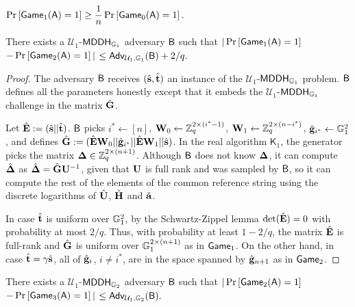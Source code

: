 \begin{lemma} $\Pr\left[ \mathsf{Game}_1(\mathsf{A})=1\right]\geq\dfrac{1}{n}\Pr\left[\mathsf{Game}_0(\mathsf{A})=1\right].$
\label{lemma:bits1}
\end{lemma}

\begin{lemma} There exists a $\mathcal{U}_1$-$\mathsf{MDDH}_{\mathbb{G}_1}$ adversary $\mathsf{B}$ such that
$|\Pr\left[\mathsf{Game}_{1}(\mathsf{A})=1\right]$ $-\Pr\left[\mathsf{Game}_{2}(\mathsf{A})=1\right]|$ $\leq
    \mathsf{Adv}_{\mathcal{U}_1,\mathbb{G}_1}(\mathsf{B}) + 2/q.$
\label{lemma:bits2}
\end{lemma}
\begin{proof}
The adversary $\mathsf{B}$ receives $({\hat{\mathbf{s}}}, {\hat{\mathbf{t}}})$ an instance of the $\mathcal{U}_1$-$\mathsf{MDDH}_{\mathbb{G}_1}$ problem.
$\mathsf{B}$ defines all the parameters honestly except that
it embeds the $\mathcal{U}_1$-$\mathsf{MDDH}_{\mathbb{G}_1}$ challenge in the matrix 
$\hat{\mathbf{{G}}}$.

Let ${\hat{\mathbf{{E}}}}:=({\hat{\mathbf{s}}}||{\hat{\mathbf{t}}})$. $\mathsf{B}$ picks $i^*\gets[n]$, $\mathbf{{W}}_0\gets\mathbb{Z}_q^{2\times(i^*-1)}$,
$\mathbf{{W}}_1\gets\mathbb{Z}_q^{2\times(n-i^*)}$,
$\hat{\mathbf{g}}_{i^*}\gets\mathbb{G}_1^{2}$,
and defines $\hat{\mathbf{{G}}} := ({\hat{\mathbf{{E}}}}\mathbf{{W}}_0||\hat{\mathbf{g}}_{i^*}||{\hat{\mathbf{{E}}}}\mathbf{{W}}_1|| {\hat{\mathbf{s}}})$. 
In the real algorithm $\mathsf{K}_1$, the generator picks the matrix $\mathbf{{\Delta}} \in \mathbb{Z}_q^{2 \times (n+1)}$.
Although $\mathsf{B}$ does not know $\mathbf{{\Delta}}$,  it can compute ${\hat{\mathbf{{\Delta}}}}$ as ${\hat{\mathbf{{\Delta}}}}= \hat{\mathbf{{G}}}\mathbf{{U}}^{-1}$,
given that $\mathbf{{U}}$ is full rank and was  sampled 
by $\mathsf{B}$, so it can compute the rest of the elements of the
common reference string  using the discrete logarithms of ${\hat{\mathbf{{U}}}}$, $\check{\mathbf{{H}}}$ and $\check{\mathbf{a}}$.  

In case ${\hat{\mathbf{t}}}$ is uniform over $\mathbb{G}_1^{2}$, by the Schwartz-Zippel lemma $\det({\hat{\mathbf{{E}}}}) = 0$ with probability at most $2/q$.
Thus, with probability at least $1-2/q$, the matrix ${\hat{\mathbf{{E}}}}$ is full-rank and $\hat{\mathbf{{G}}}$ is uniform over $\mathbb{G}_1^{2\times(n+1)}$ as in
$\mathsf{Game}_1$.
On the other hand, in case $\hat{\mathbf{t}}=\gamma {\hat{\mathbf{s}}}$, all of $\hat{\mathbf{g}}_{i}$, $i\neq i^*$, are in the space
spanned by $\hat{\mathbf{g}}_{n+1}$ as in $\mathsf{Game}_2$.
%
\end{proof}

\begin{lemma} There exists a $\mathcal{U}_1$-$\mathsf{MDDH}_{\mathbb{G}_2}$ adversary $\mathsf{B}$ such that
$|\Pr\left[\mathsf{Game}_{2}(\mathsf{A})=1\right]$ $-\Pr\left[\mathsf{Game}_{3}(\mathsf{A})=1\right]|$ $\leq
\mathsf{Adv}_{\mathcal{U}_1,\mathbb{G}_2}(\mathsf{B}).$
\label{lemma:bits3}
\end{lemma}

